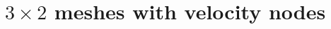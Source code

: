 \newpage
\section*{$3\times 2$ meshes with velocity nodes}

\begin{multicols}{2}


\begin{tiny}

\end{tiny}
\end{multicols}

\begin{multicols}{2}


\begin{tiny}

\end{tiny}
\end{multicols}

\begin{multicols}{2}


\begin{tiny}

\end{tiny}
\end{multicols}


\begin{multicols}{2}


\begin{tiny}

\end{tiny}
\end{multicols}

\newpage
\begin{multicols}{2}


\begin{tiny}

\end{tiny}
\end{multicols}

